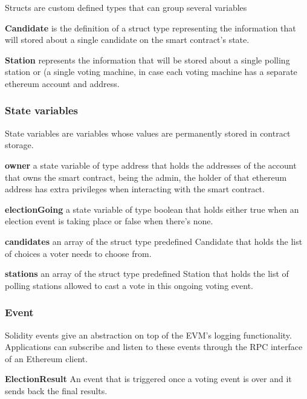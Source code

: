 Structs are custom defined types that can group several variables

\begin{list}{}{}
\item \textbf{Candidate} is the definition of a struct type representing the information that will stored about a single candidate on the smart contract's state.
\item \textbf{Station} represents the information that will be stored about a single polling station or (a single voting machine, in case each voting machine has a separate ethereum account and address.
\end{list}

\subsubsection{State variables}

State variables are variables whose values are permanently stored in contract storage.

\begin{list}{}{}
\item \textbf{owner} a state variable of type address that holds the addresses of the account that owns the smart contract, being the admin, the holder of that ethereum address has extra privileges when interacting with the smart contract.
\item \textbf{electionGoing} a state variable of type boolean that holds either true when an election event is taking place or false when there's none.
\item \textbf{candidates} an array of the struct type predefined Candidate that holds the list of choices a voter needs to choose from.
\item \textbf{stations} an array of the struct type predefined Station that holds the list of polling stations allowed to cast a vote in this ongoing voting event.
\end{list}

\subsubsection{Event}

Solidity events give an abstraction on top of the EVM’s logging functionality. Applications can subscribe and listen to these events through the RPC interface of an Ethereum client.

\begin{list}{}{}
\item \textbf{ElectionResult} An event that is triggered once a voting event is over and it sends back the final results.
\end{list}

